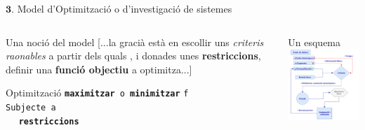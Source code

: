 \documentclass[twocolumn]{beamer}
\begin{document}
\begin{frame}{$\mathbf 3.$ Model d’Optimització o d’investigació de sistemes}
\begin{columns}[t]
\begin{column}{.5\textwidth}
	\begin{block}{Una noció del model}
		[...la gracià està en escollir uns \emph{criteris raonables}
		a partir dels quals , i donades unes \textbf{restriccions}, definir una \textbf{funció objectiu} a optimitza...]
	\end{block}

\begin{block}{Optimització}
\texttt{\textbf{maximitzar} o \textbf{minimitzar}} \texttt{f}
\\ 
\texttt{Subjecte a}
\\
$\quad $ \texttt{\textbf{restriccions}}
\end{block}
\end{column}
\begin{column}{.5\textwidth}
	\begin{block}{Un esquema}
		\includegraphics[width=5cm]{algor}
	\end{block}
\end{column}
\end{columns}
\end{frame}
\end{document}
